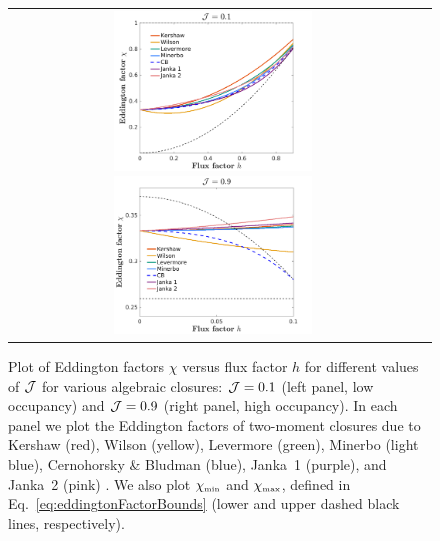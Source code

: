 \begin{figure}[h]
  \centering
  \begin{tabular}{cc}
    \includegraphics[width=0.5\textwidth]{figures/Closures0_10}
    \includegraphics[width=0.5\textwidth]{figures/Closures0_90}
  \end{tabular}
   \caption{Plot of Eddington factors $\chi$ versus flux factor $h$ for different values of $\mathcal{J}$ for various algebraic closures: $\mathcal{J}=0.1$ (left panel, low occupancy) and $\mathcal{J}=0.9$ (right panel, high occupancy).  In each panel we plot the Eddington factors of two-moment closures due to Kershaw (red), Wilson (yellow), Levermore (green), Minerbo (light blue), Cernohorsky \& Bludman (blue), Janka~1 (purple), and Janka~2 (pink) .  We also plot $\chi_{\mbox{\tiny min}}$ and $\chi_{\mbox{\tiny max}}$, defined in Eq.~\eqref{eq:eddingtonFactorBounds} (lower and upper dashed black lines, respectively).}
  \label{fig:EddingtonFactorsWithDifferentClosure}
\end{figure}